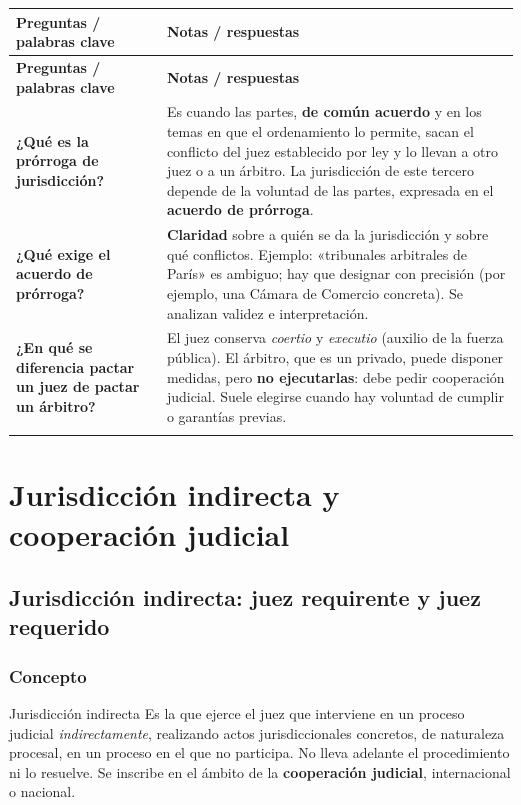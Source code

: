 \documentclass[12pt,oneside]{book}
\makeatletter
\newenvironment{cornell}{%
    \begin{longtable}{@{}>{\raggedright\arraybackslash}p{0.28\textwidth}>{\raggedright\arraybackslash}p{0.67\textwidth}@{}}
    \toprule
    \textbf{Preguntas / palabras clave} & \textbf{Notas / respuestas} \\
    \midrule
    \endfirsthead
    \toprule
    \textbf{Preguntas / palabras clave} & \textbf{Notas / respuestas} \\
    \midrule
    \endhead
}{%
    \end{longtable}
}
\newcommand{\cornellrow}[2]{\textbf{#1} & #2 \\[0.6em]}
\newcommand{\cornellresumen}[1]{%
    \midrule
    \multicolumn{2}{@{}p{\dimexpr0.95\textwidth+2\tabcolsep\relax}@{}}{\textbf{Resumen:} #1} \\
    \bottomrule
}
\makeatother
\begin{document}
\begin{cornell}
\cornellrow{¿Qué es la prórroga de jurisdicción?}{Es cuando las partes, \textbf{de común acuerdo} y en los temas en que el ordenamiento lo permite, sacan el conflicto del juez establecido por ley y lo llevan a otro juez o a un árbitro. La jurisdicción de este tercero depende de la voluntad de las partes, expresada en el \textbf{acuerdo de prórroga}.}
\cornellrow{¿Qué exige el acuerdo de prórroga?}{\textbf{Claridad} sobre a quién se da la jurisdicción y sobre qué conflictos. Ejemplo: «tribunales arbitrales de París» es ambiguo; hay que designar con precisión (por ejemplo, una Cámara de Comercio concreta). Se analizan validez e interpretación.}
\cornellrow{¿En qué se diferencia pactar un juez de pactar un árbitro?}{El juez conserva \textit{coertio} y \textit{executio} (auxilio de la fuerza pública). El árbitro, que es un privado, puede disponer medidas, pero \textbf{no ejecutarlas}: debe pedir cooperación judicial. Suele elegirse cuando hay voluntad de cumplir o garantías previas.}
\cornellresumen{La prórroga permite a las partes, mediante un acuerdo claro y en los temas en que se admite, elegir a un juez o a un árbitro distinto del que designa la ley. La jurisdicción del tercero depende del acuerdo, y la diferencia central entre juez y árbitro es que este no puede ejecutar y necesita la cooperación de un juez.}
\end{cornell}

\chapter[Jurisdicción indirecta y cooperación judicial]{Jurisdicción indirecta y cooperación judicial}

\section{Jurisdicción indirecta: juez requirente y juez requerido}

\subsection{Concepto}

\begin{definition}{Jurisdicción indirecta}
Es la que ejerce el juez que interviene en un proceso judicial \textit{indirectamente}, realizando actos jurisdiccionales concretos, de naturaleza procesal, en un proceso en el que no participa. No lleva adelante el procedimiento ni lo resuelve. Se inscribe en el ámbito de la \textbf{cooperación judicial}, internacional o nacional.
\end{definition}
\end{document}
